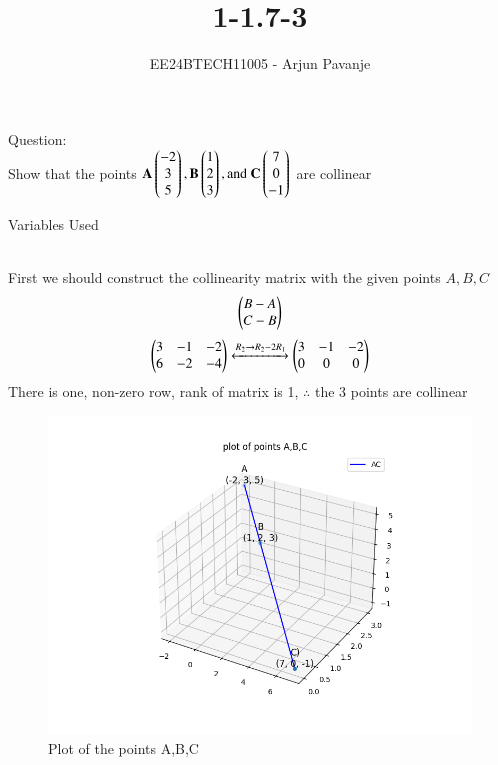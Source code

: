 \documentclass[journal]{IEEEtran}
\begin{document}

\vspace{3cm}

\title{1-1.7-3}
\author{EE24BTECH11005 - Arjun Pavanje
}
{\let\newpage\relax\maketitle}
Question:\\
Show that the points $\mathbf{A}\begin{pmatrix}-2\\3\\5\\\end{pmatrix}, \mathbf{B}\begin{pmatrix}1\\2\\3\end{pmatrix}, \text{and } \mathbf{C}\begin{pmatrix}7\\0\\-1\end{pmatrix}$ are collinear\\
\solution
\begin{table}[h!]    
  \centering
  
  \caption{Variables Used}
  \label{tab1-1.5-29}
\end{table}\\
First we should construct the collinearity matrix with the given points $A,B,C$
\begin{align}
\begin{pmatrix}
B-A \\
C-B
\end{pmatrix}
\end{align}
\begin{align}
\begin{pmatrix}
3 & -1 & -2\\
6 & -2 & -4
\end{pmatrix}
\xleftrightarrow[]{R_2 \rightarrow {R_2-2R_1}}
\begin{pmatrix}
	3 & -1 & -2\\
	0 & 0 & 0
\end{pmatrix}
\end{align}
There is one, non-zero row, rank of matrix is 1, $\therefore$ the 3 points are collinear 
\begin{figure}[h!]
   \centering
   \includegraphics[width=0.7\linewidth]{figs/fig.png}
   \caption{Plot of the points A,B,C}
   \label{stemplot}
\end{figure}
\end{document}
